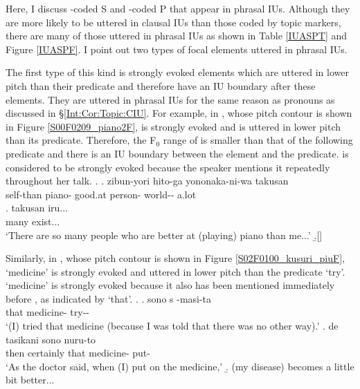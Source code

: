Here, I discuss -coded S and -coded P that
appear in phrasal IUs.
Although they are more likely to be uttered in clausal IUs than 
those coded by topic markers,
there are many of those uttered in phrasal IUs
as shown in Table \ref{IUASPT} and Figure \ref{IUASPF}.
I point out two types of focal elements uttered in phrasal IUs.

The first type of this kind is strongly evoked elements
which are uttered in lower pitch than their predicate and
therefore have an IU boundary after these elements.
They are uttered in phrasal IUs for the same reason as pronouns as discussed in \S \ref{Int:Cor:Topic:CIU}.
For example, in \Next, whose pitch contour is shown in Figure \ref{S00F0209_piano2F},
 is strongly evoked and is uttered in lower pitch than its predicate.
Therefore, the F$_{0}$ range of  is smaller than that of the following predicate and there is an IU boundary between the element  and the predicate.
 is considered to be strongly evoked
because the speaker mentions it repeatedly throughout her talk.
%
\ex.\label{S00F0209_piano2}
 \ag. zibun-yori  \tp{\dvline}  hito-ga yononaka-ni-wa takusan \tp{\dvline} \\
          self-than piano- {} good.at person- world-- a.lot {} \\
 \bg. takusan iru... \\
      many exist... \\
      `There are so many people who are better at (playing) piano than me...'
 \b.[] 

Similarly, in \Next[a], whose pitch contour is shown in Figure \ref{S02F0100_kusuri_piuF},
 `medicine' is strongly evoked and uttered in lower pitch than the predicate  `try'.
 `medicine' is strongly evoked because
it also has been mentioned immediately before \Next[a],
as indicated by  `that'.
%
\ex.\label{S02F0100_kusuri}
 \ag. sono s  \tp{\dvline} -masi-ta \tp{\dvline} \\
       that  medicine- {} try-- {} \\
       `(I) tried that medicine (because I was told that there was no other way).'
  \bg. de \tp{\dvline} tasikani sono  nuru-to \tp{\dvline} \\
       then {} certainly that medicine- put- {} \\
       `As the doctor said, when (I) put on the medicine,'
  \b. (my disease) becomes a little bit better...

